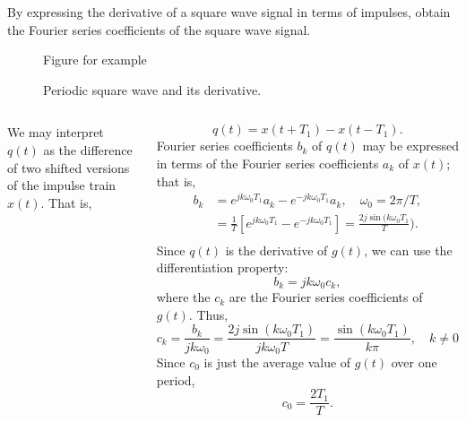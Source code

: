 \begin{frame}
    \begin{example}
        By expressing the derivative of a square wave signal in terms of impulses, obtain the Fourier series coefficients of the square wave signal.
        \begin{figure}
          \centering
          
          \caption{Figure for example}\label{fi:example3p8_square}
        \end{figure}
    \end{example}
\end{frame}

\begin{frame}
{
    \begin{figure}
      \centering
      
      \caption{Periodic square wave and its derivative.}\label{fi:deriv_periodic_square}
    \end{figure}
}
\end{frame}

\begin{frame}
{
    \begin{columns}

        We may interpret $q(t)$ as the difference of two shifted versions of the impulse train $x(t)$. That is,

        \begin{equation*}
            q(t) = x(t+T_1) - x(t-T_1).
        \end{equation*}
        \pause
        Fourier series coefficients $b_k$ of $q(t)$ may be expressed in terms of the Fourier series coefficients $a_k$ of $x(t)$; that is,
        \begin{equation*}
            \begin{split}
            b_k &= e^{jk\omega_0 T_1}a_k - e^{-jk\omega_0 T_1}a_k, \quad \omega_0 = 2\pi/T,\\
                &= \frac{1}{T}\left[e^{jk\omega_0 T_1} - e^{-jk\omega_0 T_1}\right] = \frac{2j\sin(k\omega_0 T_1}{T}).\\
            \end{split}
        \end{equation*}
        \pause
        Since $q(t)$ is the derivative of $g(t)$, we can use the differentiation property:
        \begin{equation*}
            b_k = jk\omega_0c_k,
        \end{equation*}
        where the $c_k$ are the Fourier series coefficients of $g(t)$. Thus,
        \begin{equation*}
            c_k = \frac{b_k}{jk\omega_0} = \frac{2j\sin(k\omega_0 T_1)}{jk\omega_0T} = \frac{\sin(k\omega_0 T_1)}{k\pi}, \quad k\neq 0
        \end{equation*}
        Since $c_0$ is just the average value of $g(t)$ over one period,
        \begin{equation*}
            c_0 = \frac{2T_1}{T}.
        \end{equation*}
    \end{columns}
}
\end{frame}


